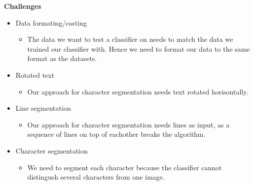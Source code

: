 \documentclass[11pt,a4paper,UKenglish]{report}
\begin{document}
\begin{flushleft}
  \textbf{Challenges}
  \begin{itemize}
    \item{Data formating/casting}
    \begin{itemize}
      \item{The data we want to test a classifier on needs to match the data we trained our classifier with. Hence we need to format our data to the same format as the datasets.}
    \end{itemize}
    \item{Rotated text}
    \begin{itemize}
      \item{Our approach for character segmentation needs text rotated horisontally.}
    \end{itemize}
      \item{Line segmentation}
    \begin{itemize}
      \item{Our approach for character segmentation needs lines as input, as a sequence of lines on top of eachother breaks the algorithm.}
    \end{itemize}
      \item{Character segmentation}
    \begin{itemize}
      \item{We need to segment each character because the classifier cannot distingush several characters from one image.}
    \end{itemize}
  \end{itemize}
\end{flushleft}
\end{document}
